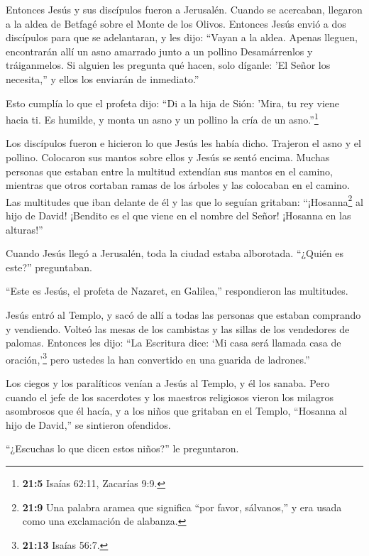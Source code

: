  Entonces Jesús y sus discípulos fueron a Jerusalén. Cuando
se acercaban, llegaron a la aldea de Betfagé sobre el Monte de los
Olivos. Entonces Jesús envió a dos discípulos para que se adelantaran,
 y les dijo: ``Vayan a la aldea. Apenas lleguen, encontrarán
allí un asno amarrado junto a un pollino Desamárrenlos y tráiganmelos.
 Si alguien les pregunta qué hacen, solo díganle: 'El Señor
los necesita,'' y ellos los enviarán de inmediato.''

 Esto cumplía lo que el profeta dijo:  ``Di a la
hija de Sión: 'Mira, tu rey viene hacia ti. Es humilde, y monta un asno
y un pollino la cría de un asno.''\footnote{\textbf{21:5} Isaías 62:11,
  Zacarías 9:9.}

 Los discípulos fueron e hicieron lo que Jesús les había
dicho.  Trajeron el asno y el pollino. Colocaron sus mantos
sobre ellos y Jesús se sentó encima.  Muchas personas que
estaban entre la multitud extendían sus mantos en el camino, mientras
que otros cortaban ramas de los árboles y las colocaban en el camino.
 Las multitudes que iban delante de él y las que lo seguían
gritaban: ``¡Hosanna\footnote{\textbf{21:9} Una palabra aramea que
  significa ``por favor, sálvanos,'' y era usada como una exclamación de
  alabanza.} al hijo de David! ¡Bendito es el que viene en el nombre del
Señor! ¡Hosanna en las alturas!''

 Cuando Jesús llegó a Jerusalén, toda la ciudad estaba
alborotada. ``¿Quién es este?'' preguntaban.

 ``Este es Jesús, el profeta de Nazaret, en Galilea,''
respondieron las multitudes.

 Jesús entró al Templo, y sacó de allí a todas las personas
que estaban comprando y vendiendo. Volteó las mesas de los cambistas y
las sillas de los vendedores de palomas.  Entonces les
dijo: ``La Escritura dice: `Mi casa será llamada casa de
oración,'\footnote{\textbf{21:13} Isaías 56:7.} pero ustedes la han
convertido en una guarida de ladrones.''

 Los ciegos y los paralíticos venían a Jesús al Templo, y
él los sanaba.  Pero cuando el jefe de los sacerdotes y los
maestros religiosos vieron los milagros asombrosos que él hacía, y a los
niños que gritaban en el Templo, ``Hosanna al hijo de David,'' se
sintieron ofendidos.

``¿Escuchas lo que dicen estos niños?'' le preguntaron.

